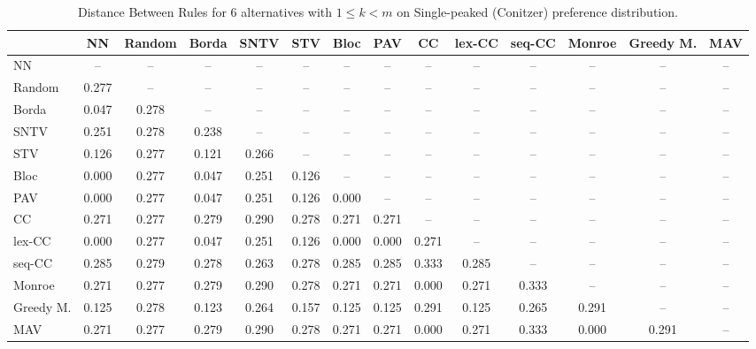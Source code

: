 
\begin{table*}
\centering
\begin{tabular}{lccccccccccccc}
\toprule
 & NN & Random & Borda & SNTV & STV & Bloc & PAV & CC & lex-CC & seq-CC & Monroe & Greedy M. & MAV \\
\midrule
NN & -- & -- & -- & -- & -- & -- & -- & -- & -- & -- & -- & -- & -- \\
Random & 0.277 & -- & -- & -- & -- & -- & -- & -- & -- & -- & -- & -- & -- \\
Borda & 0.047 & 0.278 & -- & -- & -- & -- & -- & -- & -- & -- & -- & -- & -- \\
SNTV & 0.251 & 0.278 & 0.238 & -- & -- & -- & -- & -- & -- & -- & -- & -- & -- \\
STV & 0.126 & 0.277 & 0.121 & 0.266 & -- & -- & -- & -- & -- & -- & -- & -- & -- \\
Bloc & 0.000 & 0.277 & 0.047 & 0.251 & 0.126 & -- & -- & -- & -- & -- & -- & -- & -- \\
PAV & 0.000 & 0.277 & 0.047 & 0.251 & 0.126 & 0.000 & -- & -- & -- & -- & -- & -- & -- \\
CC & 0.271 & 0.277 & 0.279 & 0.290 & 0.278 & 0.271 & 0.271 & -- & -- & -- & -- & -- & -- \\
lex-CC & 0.000 & 0.277 & 0.047 & 0.251 & 0.126 & 0.000 & 0.000 & 0.271 & -- & -- & -- & -- & -- \\
seq-CC & 0.285 & 0.279 & 0.278 & 0.263 & 0.278 & 0.285 & 0.285 & 0.333 & 0.285 & -- & -- & -- & -- \\
Monroe & 0.271 & 0.277 & 0.279 & 0.290 & 0.278 & 0.271 & 0.271 & 0.000 & 0.271 & 0.333 & -- & -- & -- \\
Greedy M. & 0.125 & 0.278 & 0.123 & 0.264 & 0.157 & 0.125 & 0.125 & 0.291 & 0.125 & 0.265 & 0.291 & -- & -- \\
MAV & 0.271 & 0.277 & 0.279 & 0.290 & 0.278 & 0.271 & 0.271 & 0.000 & 0.271 & 0.333 & 0.000 & 0.291 & -- \\
\bottomrule
\end{tabular}

\caption{Distance Between Rules for 6 alternatives with $1 \leq k < m$ on Single-peaked (Conitzer) preference distribution.}
\end{table*}
